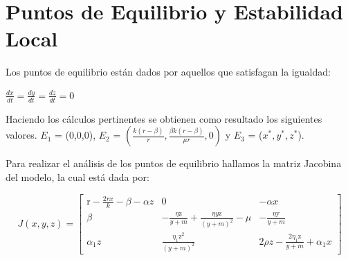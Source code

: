 \documentclass{wscpaperproc}
\theoremstyle{wsc}
\begin{document}
\section{Puntos de Equilibrio y Estabilidad Local}
Los puntos de equilibrio están dados por aquellos que satisfagan la igualdad:
\begin{center}
	$\frac{dx}{dt} = \frac{dy}{dt} = \frac{dz}{dt} = 0$
\end{center}
Haciendo los c\'alculos pertinentes se obtienen como resultado los siguientes valores.
$E_1$ = (0,0,0), $E_2$ = $(\frac{k(r-\beta)}{r}, \frac{\beta k(r-\beta)}{\mu r}, 0)$ y $E_3$ = ($x^*,y^*,z^*$).

Para realizar el análisis de los puntos de equilibrio hallamos la matriz Jacobina del modelo, la cual está dada por:

\begin{equation} \label{JacobianoEstability}
	J\left(x, y, z\right)=\left[\begin{array}{ccc}
			\mathrm{r}-\frac{2 r x}{k}-\beta-\alpha z & 0                                                                  & -\alpha x                                        \\
			\beta                                     & -\frac{\eta \mathrm{z}}{y+m}+\frac{\eta y \mathrm{z}}{(y+m)^2}-\mu & -\frac{\eta \mathrm{y}}{y+m}                     \\
			\alpha_1 z                                & \frac{\eta_1 \mathrm{z}^2}{(y+m)^2}                                & 2 \rho z-\frac{2 \eta_1 \mathrm{z}}{y+m}+\alpha_1 x
		\end{array}\right]
\end{equation}
\end{document}

